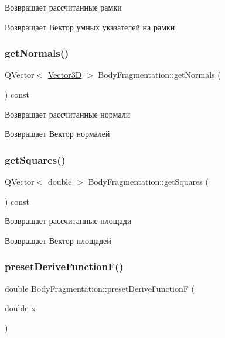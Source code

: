 Возвращает рассчитанные рамки \begin{DoxyReturn}{Возвращает}
Вектор умных указателей на рамки 
\end{DoxyReturn}
\mbox{\label{class_body_fragmentation_a5cb0e540a915963e6bca93fd4fff7c45}} 
\subsubsection{\texorpdfstring{get\+Normals()}{getNormals()}}
{\footnotesize\ttfamily Q\+Vector$<$ \mbox{\hyperlink{class_vector3_d}{Vector3D}} $>$ Body\+Fragmentation\+::get\+Normals (\begin{DoxyParamCaption}{ }\end{DoxyParamCaption}) const}

Возвращает рассчитанные нормали \begin{DoxyReturn}{Возвращает}
Вектор нормалей 
\end{DoxyReturn}
\mbox{\label{class_body_fragmentation_a52efb3896bc6200767b606311418b580}} 
\subsubsection{\texorpdfstring{get\+Squares()}{getSquares()}}
{\footnotesize\ttfamily Q\+Vector$<$ double $>$ Body\+Fragmentation\+::get\+Squares (\begin{DoxyParamCaption}{ }\end{DoxyParamCaption}) const}

Возвращает рассчитанные площади \begin{DoxyReturn}{Возвращает}
Вектор площадей 
\end{DoxyReturn}
\mbox{\label{class_body_fragmentation_aae27593b7d947e49723d6efb29533b0c}} 
\subsubsection{\texorpdfstring{preset\+Derive\+Function\+F()}{presetDeriveFunctionF()}}
{\footnotesize\ttfamily double Body\+Fragmentation\+::preset\+Derive\+FunctionF (\begin{DoxyParamCaption}\item[{double}]{x }\end{DoxyParamCaption})\hspace{0.3cm}{\ttfamily [static]}}

